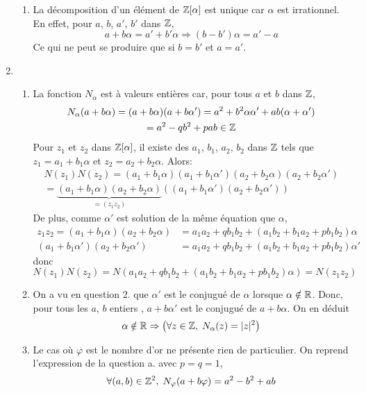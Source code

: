 \begin{enumerate}
\begin{enumerate}
    \item La décomposition d'un élément de $\mathbb{Z}[\alpha]$ est unique car $\alpha$ est irrationnel. En effet, pour $a$, $b$, $a'$, $b'$ dans $\mathbb{Z}$,
    \begin{displaymath}
      a+b\alpha = a' + b'\alpha \Rightarrow (b-b')\alpha = a' -a 
    \end{displaymath}
    Ce qui ne peut se produire que si $b=b'$ et $a=a'$.
  \end{enumerate}

  \item
  \begin{enumerate}
    \item La fonction $N_{\alpha}$ est à valeurs entières car, pour tous $a$ et $b$ dans $\mathbb{Z}$,
    \begin{multline*}
      N_{\alpha}(a+b\alpha) = (a+b\alpha)(a+b\alpha') = a^2+b^2\alpha\alpha' + ab(\alpha+\alpha')\\
      = a^2-qb^2 + pab \in \mathbb{Z}
    \end{multline*}
Pour $z_1$ et $z_2$ dans $\mathbb{Z}[\alpha]$, il existe des $a_1$, $b_1$, $a_2$, $b_2$ dans $\mathbb{Z}$ tels que $z_1=a_1+b_1\alpha$ et $z_2=a_2+b_2\alpha$. Alors:
\begin{multline*}
  N(z_1)N(z_2) = (a_1+b_1\alpha)(a_1+b_1\alpha')(a_2+b_2\alpha)(a_2+b_2\alpha')\\
  = \underset{=(z_1z_2)}{\underbrace{(a_1+b_1\alpha)(a_2+b_2\alpha)}} \left((a_1+b_1\alpha')(a_2+b_2\alpha') \right) 
\end{multline*}
De plus, comme $\alpha'$ est solution de la même équation que $\alpha$,
\begin{align*}
  z_1z_2 = (a_1+b_1\alpha)(a_2+b_2\alpha) &= a_1a_2+qb_1b_2 + (a_1b_2+b_1a_2+pb_1b_2)\alpha\\
  (a_1+b_1\alpha')(a_2+b_2\alpha') &= a_1a_2+qb_1b_2 + (a_1b_2+b_1a_2+pb_1b_2)\alpha'
\end{align*}
donc
\begin{displaymath}
  N(z_1)N(z_2) = N\left( a_1a_2+qb_1b_2 + (a_1b_2+b_1a_2+pb_1b_2)\alpha\right)
  = N(z_1z_2)
\end{displaymath}

    \item On a vu en question 2. que $\alpha'$ est le conjugué de $\alpha$ lorsque $\alpha\notin \mathbb{R}$. Donc, pour tous les $a$, $b$ entiers , $a+b\alpha'$ est le conjugué de $a+b\alpha$. On en déduit
    \begin{displaymath}
     \alpha\notin \mathbb{R} \Rightarrow \left(  \forall z\in \mathbb{Z}, \; N_{\alpha}(z) = |z|^2\right) 
    \end{displaymath}

    \item Le cas où $\varphi$ est le nombre d'or ne présente rien de particulier. On reprend l'expression de la question a. avec $p=q=1$,
    \begin{displaymath}
      \forall(a,b)\in \mathbb{Z}^2, \; N_{\varphi}(a+b\varphi) = a^2-b^2+ab
    \end{displaymath}
  \end{enumerate}
\end{enumerate}

